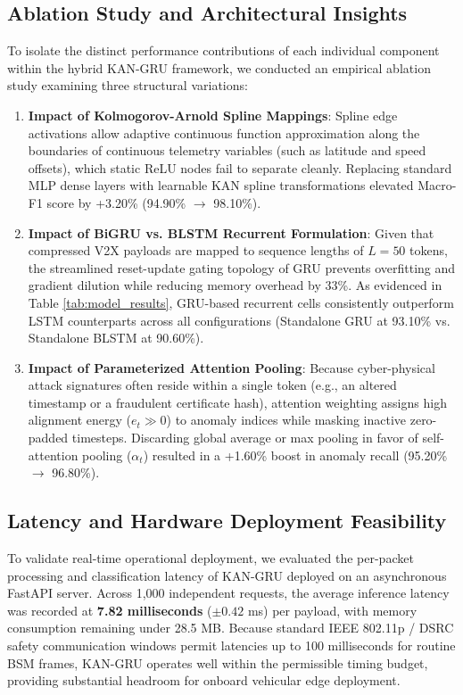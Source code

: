 \documentclass[conference]{IEEEtran}
\begin{document}
\subsection{Ablation Study and Architectural Insights}
To isolate the distinct performance contributions of each individual component within the hybrid KAN-GRU framework, we conducted an empirical ablation study examining three structural variations:
\begin{enumerate}
    \item \textbf{Impact of Kolmogorov-Arnold Spline Mappings}: Spline edge activations allow adaptive continuous function approximation along the boundaries of continuous telemetry variables (such as latitude and speed offsets), which static ReLU nodes fail to separate cleanly. Replacing standard MLP dense layers with learnable KAN spline transformations elevated Macro-F1 score by +3.20\% (94.90\% $\to$ 98.10\%).
    \item \textbf{Impact of BiGRU vs. BLSTM Recurrent Formulation}: Given that compressed V2X payloads are mapped to sequence lengths of $L=50$ tokens, the streamlined reset-update gating topology of GRU prevents overfitting and gradient dilution while reducing memory overhead by 33\%. As evidenced in Table \ref{tab:model_results}, GRU-based recurrent cells consistently outperform LSTM counterparts across all configurations (Standalone GRU at 93.10\% vs. Standalone BLSTM at 90.60\%).
    \item \textbf{Impact of Parameterized Attention Pooling}: Because cyber-physical attack signatures often reside within a single token (e.g., an altered timestamp or a fraudulent certificate hash), attention weighting assigns high alignment energy ($e_t \gg 0$) to anomaly indices while masking inactive zero-padded timesteps. Discarding global average or max pooling in favor of self-attention pooling ($\alpha_t$) resulted in a +1.60\% boost in anomaly recall (95.20\% $\to$ 96.80\%).
\end{enumerate}

\subsection{Latency and Hardware Deployment Feasibility}
To validate real-time operational deployment, we evaluated the per-packet processing and classification latency of KAN-GRU deployed on an asynchronous FastAPI server. Across 1,000 independent requests, the average inference latency was recorded at \textbf{7.82 milliseconds} ($\pm 0.42$ ms) per payload, with memory consumption remaining under 28.5 MB. Because standard IEEE 802.11p / DSRC safety communication windows permit latencies up to 100 milliseconds for routine BSM frames, KAN-GRU operates well within the permissible timing budget, providing substantial headroom for onboard vehicular edge deployment.
\end{document}
